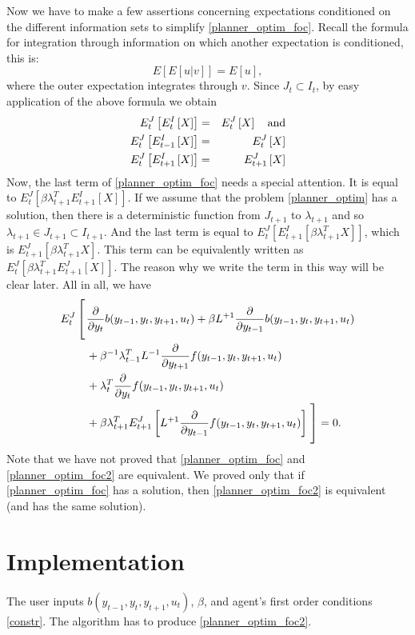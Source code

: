 \documentclass[10pt]{article}
\begin{document}
Now we have to make a few assertions concerning expectations
conditioned on the different information sets to simplify
\eqref{planner_optim_foc}. Recall the formula for integration through
information on which another expectation is conditioned, this is:
$$E\left[E\left[u|v\right]\right] = E[u],$$
where the outer expectation integrates through $v$. Since $J_t\subset
I_t$, by easy application of the above formula we obtain
\begin{eqnarray}
E^J_t\left[E^I_t\left[X\right]\right] &=& E^J_t\left[X\right]\quad\rm{and}\notag\\
E^J_t\left[E^I_{t-1}\left[X\right]\right] &=& E^J_t\left[X\right]\label{e_iden}\\
E^J_t\left[E^I_{t+1}\left[X\right]\right] &=& E^J_{t+1}\left[X\right]\notag
\end{eqnarray}
Now, the last term of \eqref{planner_optim_foc} needs a special
attention. It is equal to
$E^J_t\left[\beta\lambda^T_{t+1}E^I_{t+1}[X]\right]$. If we assume
that the problem \eqref{planner_optim} has a solution, then there is a
deterministic function from $J_{t+1}$ to $\lambda_{t+1}$ and so
$\lambda_{t+1}\in J_{t+1}\subset I_{t+1}$. And the last term is equal
to $E^J_{t}\left[E^I_{t+1}[\beta\lambda^T_{t+1}X]\right]$, which is
$E^J_{t+1}\left[\beta\lambda^T_{t+1}X\right]$. This term can be
equivalently written as
$E^J_{t}\left[\beta\lambda^T_{t+1}E^J_{t+1}[X]\right]$. The reason why
we write the term in this way will be clear later. All in all, we have
\begin{align}
E^J_t\left[\vphantom{\frac{\int^(_)}{\int^(\_)}}\right.&\frac{\partial}{\partial y_t}b(y_{t-1},y_t,y_{t+1},u_t)+
\beta L^{+1}\frac{\partial}{\partial y_{t-1}}b(y_{t-1},y_t,y_{t+1},u_t)\notag\\
&+\beta^{-1}\lambda_{t-1}^TL^{-1}\frac{\partial}{\partial y_{t+1}}f(y_{t-1},y_t,y_{t+1},u_t)\notag\\
&+\lambda_t^T\frac{\partial}{\partial y_{t}}f(y_{t-1},y_t,y_{t+1},u_t)\notag\\
&+\beta\lambda_{t+1}^TE^J_{t+1}\left[L^{+1}\frac{\partial}{\partial y_{t-1}}f(y_{t-1},y_t,y_{t+1},u_t)\right]
\left.\vphantom{\frac{\int^(_)}{\int^(\_)}}\right]
 = 0.\label{planner_optim_foc2}
\end{align}
Note that we have not proved that \eqref{planner_optim_foc} and
\eqref{planner_optim_foc2} are equivalent. We proved only that if
\eqref{planner_optim_foc} has a solution, then
\eqref{planner_optim_foc2} is equivalent (and has the same solution).

\section{Implementation}

The user inputs $b(y_{t-1},y_t,y_{t+1},u_t)$, $\beta$, and agent's
first order conditions \eqref{constr}. The algorithm has to produce
\eqref{planner_optim_foc2}.
\end{document}
